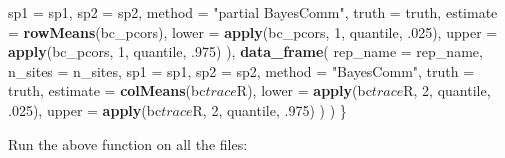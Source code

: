 \documentclass[11pt,]{article}
\newenvironment{Shaded}{\begin{snugshade}}{\end{snugshade}}
\newcommand{\KeywordTok}[1]{\textcolor[rgb]{0.13,0.29,0.53}{\textbf{{#1}}}}
\newcommand{\DataTypeTok}[1]{\textcolor[rgb]{0.13,0.29,0.53}{{#1}}}
\newcommand{\DecValTok}[1]{\textcolor[rgb]{0.00,0.00,0.81}{{#1}}}
\newcommand{\CharTok}[1]{\textcolor[rgb]{0.31,0.60,0.02}{{#1}}}
\newcommand{\StringTok}[1]{\textcolor[rgb]{0.31,0.60,0.02}{{#1}}}
\newcommand{\CommentTok}[1]{\textcolor[rgb]{0.56,0.35,0.01}{\textit{{#1}}}}
\newcommand{\OtherTok}[1]{\textcolor[rgb]{0.56,0.35,0.01}{{#1}}}
\newcommand{\NormalTok}[1]{{#1}}
\begin{document}
\begin{Shaded}
\begin{Highlighting}[]
      \DataTypeTok{sp1 =} \NormalTok{sp1,}
      \DataTypeTok{sp2 =} \NormalTok{sp2,}
      \DataTypeTok{method =} \StringTok{"partial BayesComm"}\NormalTok{,}
      \DataTypeTok{truth =} \NormalTok{truth,}
      \DataTypeTok{estimate =} \KeywordTok{rowMeans}\NormalTok{(bc_pcors),}
      \DataTypeTok{lower =} \KeywordTok{apply}\NormalTok{(bc_pcors, }\DecValTok{1}\NormalTok{, quantile, .}\DecValTok{025}\NormalTok{),}
      \DataTypeTok{upper =} \KeywordTok{apply}\NormalTok{(bc_pcors, }\DecValTok{1}\NormalTok{, quantile, .}\DecValTok{975}\NormalTok{)}
    \NormalTok{),}
    \KeywordTok{data_frame}\NormalTok{(}
      \DataTypeTok{rep_name =} \NormalTok{rep_name,}
      \DataTypeTok{n_sites =} \NormalTok{n_sites,}
      \DataTypeTok{sp1 =} \NormalTok{sp1,}
      \DataTypeTok{sp2 =} \NormalTok{sp2,}
      \DataTypeTok{method =} \StringTok{"BayesComm"}\NormalTok{,}
      \DataTypeTok{truth =} \NormalTok{truth,}
      \DataTypeTok{estimate =} \KeywordTok{colMeans}\NormalTok{(bc$trace$R),}
      \DataTypeTok{lower =} \KeywordTok{apply}\NormalTok{(bc$trace$R, }\DecValTok{2}\NormalTok{, quantile, .}\DecValTok{025}\NormalTok{),}
      \DataTypeTok{upper =} \KeywordTok{apply}\NormalTok{(bc$trace$R, }\DecValTok{2}\NormalTok{, quantile, .}\DecValTok{975}\NormalTok{)}
    \NormalTok{)}
  \NormalTok{)}
\NormalTok{\}}
\end{Highlighting}
\end{Shaded}

Run the above function on all the files:

\begin{Shaded}
\end{Shaded}
\end{document}
